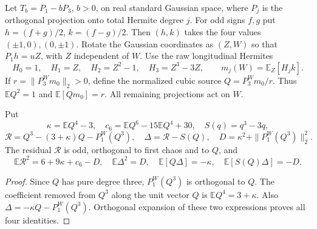 Let $T_b=P_1-bP_3$, $b>0$, on real standard Gaussian space, where $P_j$
is the orthogonal projection onto total Hermite degree $j$.
For odd signs $f,g$ put $h=(f+g)/2$, $k=(f-g)/2$.
Then $(h,k)$ takes the four values $(\pm1,0),(0,\pm1)$.
Rotate the Gaussian coordinates as $(Z,W)$ so that $P_1h=uZ$,
with $Z$ independent of $W$.  Use the raw longitudinal Hermites
\[
 H_0=1,\quad H_1=Z,\quad H_2=Z^2-1,\quad H_3=Z^3-3Z,
 \qquad m_j(W)=\mathbb E_Z[H_jk].
\]
If $r=\|P_3^Wm_0\|_2>0$, define the normalized cubic source
$Q=P_3^Wm_0/r$.  Thus $\mathbb EQ^2=1$ and
$\mathbb E[Qm_0]=r$.  All remaining projections act on $W$.

\begin{proposition}
\label{prop:physical-r3-source}
Put
\[
 \kappa=\mathbb EQ^4-3,\quad c_6=\mathbb EQ^6-15\mathbb EQ^4+30,
 \quad S(q)=q^3-3q,
\]
\[
 \mathcal R=Q^3-(3+\kappa)Q-P_1^W(Q^3),\quad
 \Delta=\mathcal R-S(Q),\quad
 D=\kappa^2+\|P_1^W(Q^3)\|_2^2.
\]
The residual $\mathcal R$ is odd, orthogonal to first chaos and to $Q$, and
\begin{equation}\label{eq:physical-r3-identities}
 \mathbb E\mathcal R^2=6+9\kappa+c_6-D,\quad
 \mathbb E\Delta^2=D,\quad
 \mathbb E[Q\Delta]=-\kappa,\quad
 \mathbb E[S(Q)\Delta]=-D.
\end{equation}
\end{proposition}
\begin{proof}
Since $Q$ has pure degree three, $P_1^W(Q^3)$ is orthogonal to $Q$.
The coefficient removed from $Q^3$ along the unit vector $Q$ is
$\mathbb EQ^4=3+\kappa$.  Also
$\Delta=-\kappa Q-P_1^W(Q^3)$.  Orthogonal expansion of these two
expressions proves all four identities.
\end{proof}

